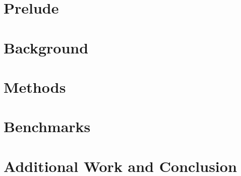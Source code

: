 \documentclass[11pt,fleqn,twoside]{book}
\title{%
Compression Techniques for Inverted Lists in Web Search Engines.
\vskip 1em 
Inverted Lists Structure for Semi-Structured Web Data Search.
}
\begin{document}
%
%

\maketitle

\newpage 
{}

{\small

\tableofcontents
}

\newpage
{}

%
%
\part{Prelude}%
\label{sec:prelude}


\part{Background}
\label{part:background}


\part{Methods}
\label{part:methods}


\part{Benchmarks}
\label{part:benchmarks}


\part{Additional Work and  Conclusion}
\label{part:conclusion}


\appendix



%




{\small

\lstlistoflistings
\listoffigures
\listoftables
}
\end{document}
